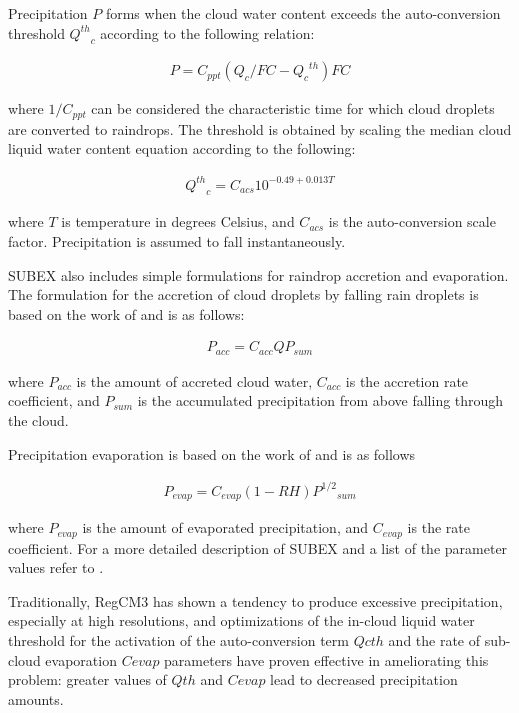 {Precipitation $P$ forms when the cloud water content exceeds the auto-conversion
threshold ${Q^{th}}_c$ according to the following relation:

\begin{eqnarray}
P = C_{ppt}(Q_c/FC - {{Q_c}^{th}})FC
\end{eqnarray}

where $1/C_{ppt}$ can be considered the characteristic time for which
cloud droplets are converted to raindrops.  The threshold is obtained by scaling
the median cloud liquid water content equation according to the following:

\begin{eqnarray}
{Q^{th}}_c = C_{acs} 10^{-0.49 + 0.013T}
\end{eqnarray}

where $T$ is temperature in degrees Celsius, and $C_{acs}$ is the
auto-conversion scale factor.  Precipitation is assumed to fall instantaneously.

SUBEX also includes simple formulations for raindrop accretion and evaporation.
The formulation for the accretion of cloud droplets by falling rain droplets is
based on the work of \cite{Beheng_94} and is as follows:

\begin{eqnarray}
P_{acc} = C_{acc} Q P_{sum}
\end{eqnarray}

where $P_{acc}$ is the amount of accreted cloud water, $C_{acc}$ is
the accretion rate coefficient, and $P_{sum}$ is the accumulated precipitation
from above falling through the cloud.  

Precipitation evaporation is based on the work of \cite{Sundqvist_89} and is as
follows

\begin{eqnarray}
P_{evap} = C_{evap} (1-RH) {P^{1/2}}_{sum}
\end{eqnarray}

where $P_{evap}$ is the amount of evaporated precipitation, and
$C_{evap}$ is the rate coefficient.  For a more detailed description of SUBEX
and a list of the parameter values refer to \cite{Pal_00}. 

Traditionally, \ac{RegCM3} has shown a tendency to produce excessive
precipitation, especially at high resolutions, and optimizations of 
the in-cloud liquid water threshold for the activation of the auto-conversion
term $Qcth$ and the rate of sub-cloud evaporation $Cevap$ parameters have
proven effective in ameliorating this problem: greater values of $Qth$ and
$Cevap$ lead to decreased precipitation amounts.

}
